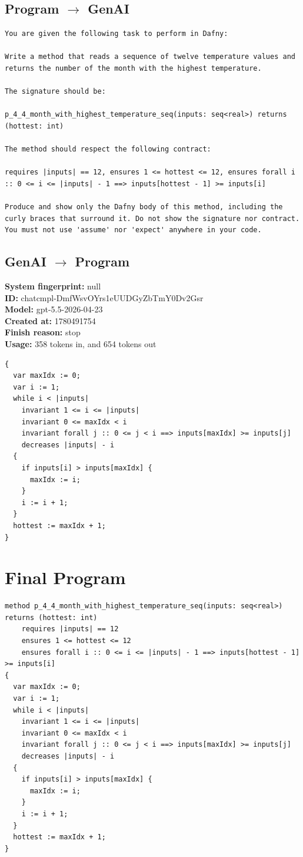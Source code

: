 \documentclass{article}
\begin{document}
\subsection*{Program $\rightarrow$ GenAI}
\begin{lstlisting}
You are given the following task to perform in Dafny:

Write a method that reads a sequence of twelve temperature values and returns the number of the month with the highest temperature.

The signature should be:

p_4_4_month_with_highest_temperature_seq(inputs: seq<real>) returns (hottest: int)

The method should respect the following contract:

requires |inputs| == 12, ensures 1 <= hottest <= 12, ensures forall i :: 0 <= i <= |inputs| - 1 ==> inputs[hottest - 1] >= inputs[i]

Produce and show only the Dafny body of this method, including the curly braces that surround it. Do not show the signature nor contract. You must not use 'assume' nor 'expect' anywhere in your code.
\end{lstlisting}
\subsection*{GenAI $\rightarrow$ Program}
\textbf{System fingerprint: }null
\\\textbf{ID: }chatcmpl-DmfWsvOYrs1eUUDGyZbTmY0Dv2Gsr
\\\textbf{Model: }gpt-5.5-2026-04-23
\\\textbf{Created at: }1780491754
\\\textbf{Finish reason: }stop
\\\textbf{Usage: }358 tokens in, and 654 tokens out
\begin{lstlisting}
{
  var maxIdx := 0;
  var i := 1;
  while i < |inputs|
    invariant 1 <= i <= |inputs|
    invariant 0 <= maxIdx < i
    invariant forall j :: 0 <= j < i ==> inputs[maxIdx] >= inputs[j]
    decreases |inputs| - i
  {
    if inputs[i] > inputs[maxIdx] {
      maxIdx := i;
    }
    i := i + 1;
  }
  hottest := maxIdx + 1;
}
\end{lstlisting}
\section*{Final Program}
\begin{lstlisting}
method p_4_4_month_with_highest_temperature_seq(inputs: seq<real>) returns (hottest: int)
	requires |inputs| == 12
	ensures 1 <= hottest <= 12
	ensures forall i :: 0 <= i <= |inputs| - 1 ==> inputs[hottest - 1] >= inputs[i]
{
  var maxIdx := 0;
  var i := 1;
  while i < |inputs|
    invariant 1 <= i <= |inputs|
    invariant 0 <= maxIdx < i
    invariant forall j :: 0 <= j < i ==> inputs[maxIdx] >= inputs[j]
    decreases |inputs| - i
  {
    if inputs[i] > inputs[maxIdx] {
      maxIdx := i;
    }
    i := i + 1;
  }
  hottest := maxIdx + 1;
}
\end{lstlisting}
\end{document}
